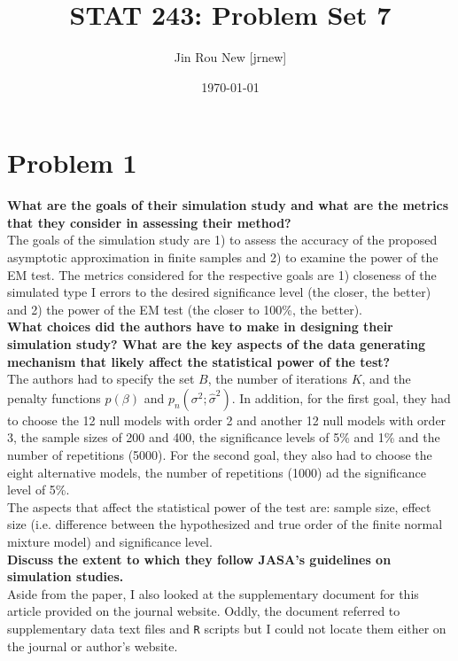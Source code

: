 \documentclass{article}\usepackage[]{graphicx}\usepackage[]{color}
\title{STAT 243: Problem Set 7}
\author{Jin Rou New [jrnew]}
\date{\today}
\begin{document}
\maketitle

\section*{Problem 1}

\textbf{What are the goals of their simulation study and what are the metrics that they consider in assessing their method?} \\
The goals of the simulation study are 1) to assess the accuracy of the proposed asymptotic approximation in finite samples and 2) to examine the power of the EM test. The metrics considered for the respective goals are 1) closeness of the simulated type I errors to the desired significance level (the closer, the better) and 2) the power of the EM test (the closer to 100\%, the better).\\

\textbf{What choices did the authors have to make in designing their simulation study? What are the key aspects of the data generating mechanism that likely affect the statistical power of the test?} \\
The authors had to specify the set $B$, the number of iterations $K$, and the penalty functions $p(\beta)$ and $p_{n}(\sigma^2; \hat{\sigma}^2)$. In addition, for the first goal, they had to choose the 12 null models with order 2 and another 12 null models with order 3, the sample sizes of 200 and 400, the significance levels of 5\% and 1\% and the number of repetitions (5000). For the second goal, they also had to choose the eight alternative models, the number of repetitions (1000) ad the significance level of 5\%.\\

The aspects that affect the statistical power of the test are: sample size, effect size (i.e. difference between the hypothesized and true order of the finite normal mixture model) and significance level. \\


\textbf{Discuss the extent to which they follow JASA's guidelines on simulation studies.} \\
Aside from the paper, I also looked at the supplementary document for this article provided on the journal website. Oddly, the document referred to supplementary data text files and \texttt{R} scripts but I could not locate them either on the journal or author's website.\\
\end{document}
